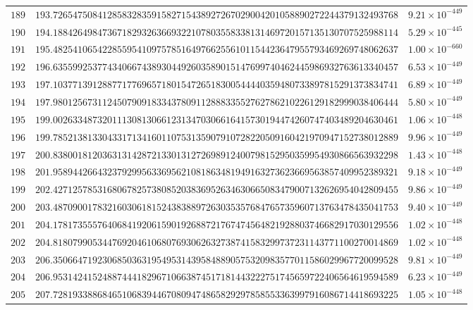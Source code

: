 \documentclass[12pt,reqno]{amsart}
\theoremstyle{remark}
\begin{document}
\begin{longtable}{clc}
$189$ & $193.7265475084128583283591582715438927267029004201058890272244379132493768$ & $9.21\times 10^{-449}$ \\
$190$ & $194.1884264984736718293263669322107803558338131469720157135130707525988114$ & $5.29\times 10^{-445}$ \\
$191$ & $195.4825410654228559541097578516497662556101154423647955793469269748062637$ & $1.00\times 10^{-660}$ \\
$192$ & $196.6355992537743406674389304492603589015147699740462445986932763613340457$ & $6.53\times 10^{-449}$ \\
$193$ & $197.1037713912887717769657180154726518300544440359480733897815291373834741$ & $6.89\times 10^{-449}$ \\
$194$ & $197.9801256731124507909183343780911288833552762786210226129182999038406444$ & $5.80\times 10^{-449}$ \\
$195$ & $199.0026334873201113081306612313470306616415730194474260747403489204630461$ & $1.06\times 10^{-448}$ \\
$196$ & $199.7852138133043317134160110753135907910728220509160421970947152738012889$ & $9.96\times 10^{-449}$ \\
$197$ & $200.8380018120363131428721330131272698912400798152950359954930866563932298$ & $1.43\times 10^{-448}$ \\
$198$ & $201.9589442664323792995633695621081863481949163273623669563857409952389321$ & $9.18\times 10^{-449}$ \\
$199$ & $202.4271257853168067825738085203836952634630665083479007132626954042809455$ & $9.86\times 10^{-449}$ \\
$200$ & $203.4870900178321603061815243838897263035357684765735960713763478435041753$ & $9.40\times 10^{-449}$ \\
$201$ & $204.1781735557640684192061590192688721767474564821928803746682917030129556$ & $1.02\times 10^{-448}$ \\
$202$ & $204.8180799053447692046106807693062632738741583299737231143771100270014869$ & $1.02\times 10^{-448}$ \\
$203$ & $206.3506647192306850363195495314395848890575320983577011586029967720099528$ & $9.81\times 10^{-449}$ \\
$204$ & $206.9531424152488744418296710663874517181443222751745659722406564619594589$ & $6.23\times 10^{-449}$ \\
$205$ & $207.7281933886846510683944670809474865829297858553363997916086714418693225$ & $1.05\times 10^{-448}$ \\

\end{longtable}
\end{document}
